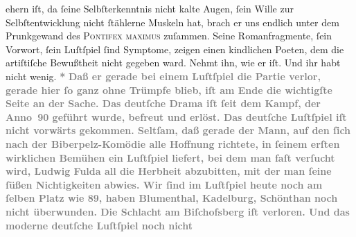 \begin{ledgroupsized}[t]{13cm}
{{                  ehern iſt, da ſeine Selbſterkenntnis nicht kalte Augen, ſein Wille zur
                  Selbſtentwicklung nicht ſtählerne Muskeln hat, brach er uns endlich unter dem
                  Prunkgewand des \textsc{Pontifex maximus} zuſammen. Seine
                  Romanfragmente, ſein Vorwort, ſein Luſtſpiel ſind Symptome, zeigen einen
                  kindlichen Poeten, dem die artiſtiſche Bewußtheit nicht gegeben ward. Nehmt ihn,
                  wie er iſt. Und ihr habt nicht wenig.}}\pend
           \pstart
           \centering{}\textcolor{gray}{\textbf{*}}\pend
           \pstart
           \noindent{}\textcolor{gray}{\textbf{Daß er gerade bei einem Luſtſpiel die Partie verlor, gerade hier
                  ſo ganz ohne Trümpfe blieb, iſt am Ende die wichtigſte Seite an der Sache. Das
                  deutſche Drama iſt ſeit dem Kampf, der Anno 90 geführt wurde, befreut und
                  erlöst. Das deutſche Luſtſpiel iſt nicht vorwärts gekommen. Seltſam, daß gerade
                  der Mann, auf den ſich nach der Biberpelz-Komödie alle Hoffnung richtete, in ſeinem erſten wirklichen
                  Bemühen ein Luſtſpiel liefert, bei dem man faſt verſucht wird, Ludwig Fulda all die Herbheit abzubitten, mit der man ſeine
                  ſüßen Nichtigkeiten abwies. Wir ſind im Luſtſpiel heute noch am ſelben Platz wie
                  89, haben Blumenthal, Kadelburg, Schönthan
                  noch nicht überwunden. Die Schlacht am Biſchofsberg iſt verloren. Und das moderne deutſche Luſtſpiel noch nicht
}}
\end{ledgroupsized}
